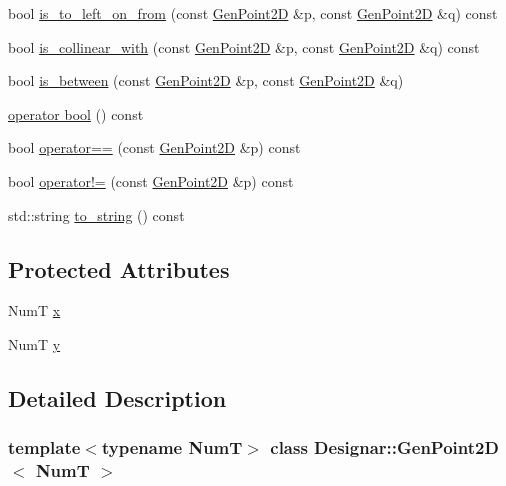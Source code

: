 \begin{DoxyCompactItemize}
\item 
bool \hyperlink{class_designar_1_1_gen_point2_d_af23c6b5033a1e261288d0ba9185f2d53}{is\+\_\+to\+\_\+left\+\_\+on\+\_\+from} (const \hyperlink{class_designar_1_1_gen_point2_d}{Gen\+Point2D} \&p, const \hyperlink{class_designar_1_1_gen_point2_d}{Gen\+Point2D} \&q) const
\item 
bool \hyperlink{class_designar_1_1_gen_point2_d_a5ffe32dc4a322ba54d2bcc0d4b2a04e6}{is\+\_\+collinear\+\_\+with} (const \hyperlink{class_designar_1_1_gen_point2_d}{Gen\+Point2D} \&p, const \hyperlink{class_designar_1_1_gen_point2_d}{Gen\+Point2D} \&q) const
\item 
bool \hyperlink{class_designar_1_1_gen_point2_d_ad08c66d5213123e3c3e804d1fbeedee3}{is\+\_\+between} (const \hyperlink{class_designar_1_1_gen_point2_d}{Gen\+Point2D} \&p, const \hyperlink{class_designar_1_1_gen_point2_d}{Gen\+Point2D} \&q)
\item 
\hyperlink{class_designar_1_1_gen_point2_d_a9f54b6e39d8ea1b2eb2fdab5ce548c9f}{operator bool} () const
\item 
bool \hyperlink{class_designar_1_1_gen_point2_d_a747d02a58ebf0cc451de6075650f6596}{operator==} (const \hyperlink{class_designar_1_1_gen_point2_d}{Gen\+Point2D} \&p) const
\item 
bool \hyperlink{class_designar_1_1_gen_point2_d_af8feb3aa4f9bd38166ef9ea16018d4f4}{operator!=} (const \hyperlink{class_designar_1_1_gen_point2_d}{Gen\+Point2D} \&p) const
\item 
std\+::string \hyperlink{class_designar_1_1_gen_point2_d_ab526fff4fe942d9b5a7e71d48ad50168}{to\+\_\+string} () const
\end{DoxyCompactItemize}
\subsection*{Protected Attributes}
\begin{DoxyCompactItemize}
\item 
NumT \hyperlink{class_designar_1_1_gen_point2_d_a1ffcc660a16a77dc488bb69525cc99de}{x}
\item 
NumT \hyperlink{class_designar_1_1_gen_point2_d_a89aada53ecce4e14878c1a97843ed2d2}{y}
\end{DoxyCompactItemize}


\subsection{Detailed Description}
\subsubsection*{template$<$typename NumT$>$\newline
class Designar\+::\+Gen\+Point2\+D$<$ Num\+T $>$}



